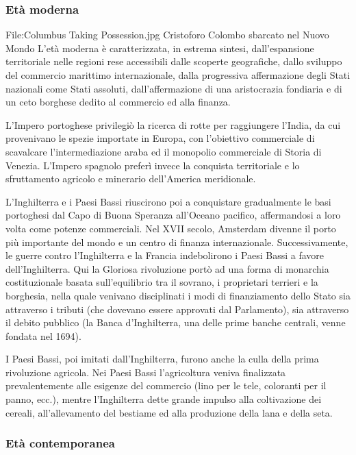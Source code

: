 \subsubsection{Età moderna}

File:Columbus Taking Possession.jpg Cristoforo Colombo 
sbarcato nel Nuovo Mondo
L'età moderna è caratterizzata, in estrema sintesi, 
dall'espansione territoriale nelle regioni rese accessibili dalle scoperte 
geografiche, dallo sviluppo del commercio marittimo internazionale, dalla 
progressiva affermazione degli Stati nazionali come Stati 
assoluti, dall'affermazione di una aristocrazia fondiaria e di un ceto 
borghese dedito al commercio ed alla finanza.

L'Impero portoghese privilegiò la ricerca di rotte per raggiungere 
l'India, da cui provenivano le spezie importate in Europa, con l'obiettivo 
commerciale di scavalcare l'intermediazione araba ed il monopolio commerciale 
di Storia di Venezia. L'Impero spagnolo preferì invece la 
conquista territoriale e lo sfruttamento agricolo e minerario dell'America 
meridionale.

L'Inghilterra e i Paesi Bassi riuscirono poi a conquistare gradualmente 
le basi portoghesi dal Capo di Buona Speranza all'Oceano pacifico, 
affermandosi a loro volta come potenze commerciali. Nel XVII secolo, 
Amsterdam divenne il porto più importante del mondo e un centro di finanza 
internazionale. Successivamente, le guerre contro l'Inghilterra e la 
Francia indebolirono i Paesi Bassi a favore dell'Inghilterra. Qui 
la Gloriosa rivoluzione portò ad una forma di monarchia costituzionale 
basata sull'equilibrio tra il sovrano, i proprietari terrieri e la borghesia, 
nella quale venivano disciplinati i modi di finanziamento dello Stato sia 
attraverso i tributi (che dovevano essere approvati dal Parlamento), sia 
attraverso il debito pubblico (la Banca d'Inghilterra, una delle prime 
banche centrali, venne fondata nel 1694).

I Paesi Bassi, poi imitati dall'Inghilterra, furono anche la culla 
della prima rivoluzione agricola. 
Nei Paesi Bassi l'agricoltura veniva finalizzata prevalentemente alle esigenze 
del commercio (lino per le tele, coloranti per il panno, ecc.), mentre 
l'Inghilterra dette grande impulso alla coltivazione dei cereali, 
all'allevamento del bestiame ed alla produzione della lana e della seta.

\subsubsection{Età contemporanea}

